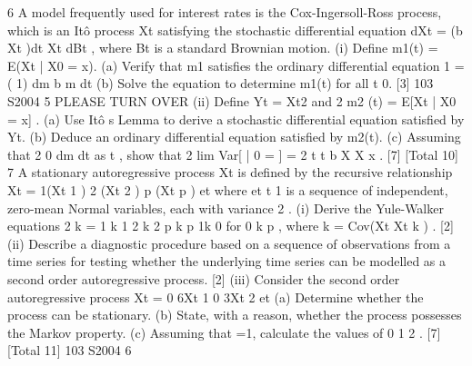 \documentclass[a4paper,12pt]{article}
\begin{document}
\begin{enumerate}

6 A model frequently used for interest rates is the Cox-Ingersoll-Ross process, which is
an Itô process Xt satisfying the stochastic differential equation
dXt = (b Xt )dt Xt dBt ,
where Bt is a standard Brownian motion.
(i) Define m1(t) = E(Xt | X0 = x).
(a) Verify that m1 satisfies the ordinary differential equation
1
= ( 1)
dm
b m
dt
(b) Solve the equation to determine m1(t) for all t 0. [3]
103 S2004 5 PLEASE TURN OVER
(ii) Define Yt = Xt2 and 2
m2 (t) = E[Xt | X0 = x] .
(a) Use Itô s Lemma to derive a stochastic differential equation satisfied
by Yt.
(b) Deduce an ordinary differential equation satisfied by m2(t).
(c) Assuming that 2 0
dm
dt
as t , show that
2
lim Var[ | 0 = ] =
2 t t
b
X X x .
[7]
[Total 10]
7 A stationary autoregressive process Xt is defined by the recursive relationship
Xt = 1(Xt 1 ) 2 (Xt 2 ) p (Xt p ) et
where {et t 1} is a sequence of independent, zero-mean Normal variables, each
with variance 2 .
(i) Derive the Yule-Walker equations
2
k = 1 k 1 2 k 2 p k p 1k 0
for 0 k p , where k = Cov(Xt Xt k ) . [2]
(ii) Describe a diagnostic procedure based on a sequence of observations from a
time series for testing whether the underlying time series can be modelled as a
second order autoregressive process. [2]
(iii) Consider the second order autoregressive process
Xt = 0 6Xt 1 0 3Xt 2 et
(a) Determine whether the process can be stationary.
(b) State, with a reason, whether the process possesses the Markov
property.
(c) Assuming that =1, calculate the values of 0 1 2 . [7]
[Total 11]
103 S2004 6



\end{enumerate}
\end{document}
